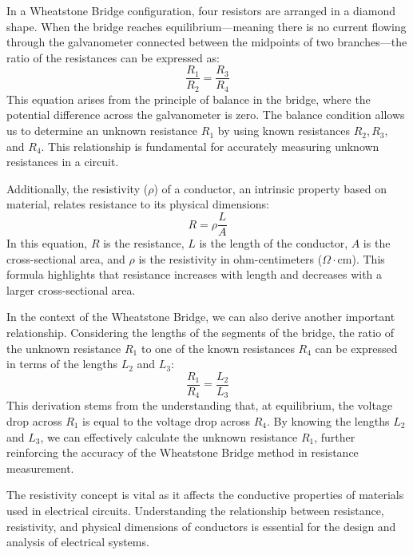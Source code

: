 \documentclass[journal]{IEEEtran}
\begin{document}
In a Wheatstone Bridge configuration, four resistors are arranged in a diamond shape. When the bridge reaches equilibrium—meaning there is no current flowing through the galvanometer connected between the midpoints of two branches—the ratio of the resistances can be expressed as:
\begin{equation}
    \frac{R_1}{R_2} = \frac{R_3}{R_4}
    \label{eq:wheatstone}
\end{equation}
This equation arises from the principle of balance in the bridge, where the potential difference across the galvanometer is zero. The balance condition allows us to determine an unknown resistance \( R_1 \) by using known resistances \( R_2, R_3, \) and \( R_4 \). This relationship is fundamental for accurately measuring unknown resistances in a circuit.

Additionally, the resistivity (\(\rho\)) of a conductor, an intrinsic property based on material, relates resistance to its physical dimensions:
\begin{equation}
    R = \rho \frac{L}{A}
    \label{eq:resistivity}
\end{equation}
In this equation, \( R \) is the resistance, \( L \) is the length of the conductor, \( A \) is the cross-sectional area, and \( \rho \) is the resistivity in ohm-centimeters (\(\Omega \cdot \text{cm}\)). This formula highlights that resistance increases with length and decreases with a larger cross-sectional area.

In the context of the Wheatstone Bridge, we can also derive another important relationship. Considering the lengths of the segments of the bridge, the ratio of the unknown resistance \( R_1 \) to one of the known resistances \( R_4 \) can be expressed in terms of the lengths \( L_2 \) and \( L_3 \):
\begin{equation}
    \frac{R_1}{R_4} = \frac{L_2}{L_3}
    \label{eq:wheatstone_length}
\end{equation}
This derivation stems from the understanding that, at equilibrium, the voltage drop across \( R_1 \) is equal to the voltage drop across \( R_4 \). By knowing the lengths \( L_2 \) and \( L_3 \), we can effectively calculate the unknown resistance \( R_1 \), further reinforcing the accuracy of the Wheatstone Bridge method in resistance measurement.

The resistivity concept is vital as it affects the conductive properties of materials used in electrical circuits. Understanding the relationship between resistance, resistivity, and physical dimensions of conductors is essential for the design and analysis of electrical systems.
\end{document}
